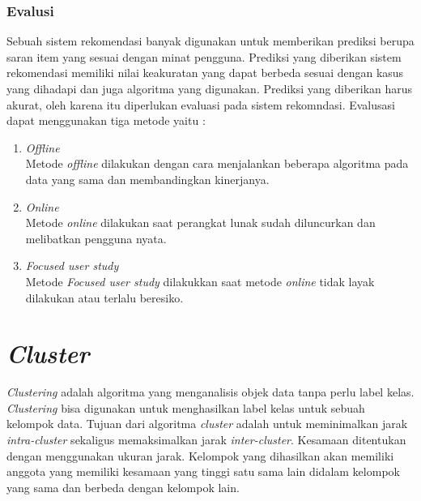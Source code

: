 \subsubsection{Evalusi}
Sebuah sistem rekomendasi banyak digunakan untuk memberikan prediksi berupa saran item yang sesuai dengan minat pengguna. Prediksi yang diberikan sistem rekomendasi memiliki nilai keakuratan yang dapat berbeda sesuai dengan kasus yang dihadapi dan juga algoritma yang digunakan. Prediksi yang diberikan harus akurat, oleh karena itu diperlukan evaluasi pada sistem rekomndasi. Evalusasi dapat menggunakan tiga metode yaitu :

\begin{enumerate}
	\item \textit{Offline}\\
		Metode \textit{offline} dilakukan dengan cara menjalankan beberapa algoritma pada data yang sama dan membandingkan kinerjanya.

	\item \textit{Online}\\
		Metode \textit{online} dilakukan saat perangkat lunak sudah diluncurkan dan melibatkan pengguna nyata. 
		
	\item \textit{Focused user study}\\
		Metode \textit{Focused user study} dilakukkan saat metode \textit{online} tidak layak dilakukan atau terlalu beresiko.
	
\end{enumerate}


\section{\textit{Cluster}}
\label{sec:cluster}
\textit{Clustering} adalah algoritma yang menganalisis objek data tanpa perlu label kelas. \textit{Clustering} bisa digunakan untuk menghasilkan label kelas untuk sebuah kelompok data. Tujuan dari algoritma \textit{cluster} adalah untuk meminimalkan jarak \textit{intra-cluster} sekaligus memaksimalkan jarak \textit{inter-cluster}. Kesamaan ditentukan dengan menggunakan ukuran jarak. Kelompok yang dihasilkan akan memiliki anggota yang memiliki kesamaan yang tinggi satu sama lain  didalam kelompok yang sama dan berbeda dengan kelompok lain.

